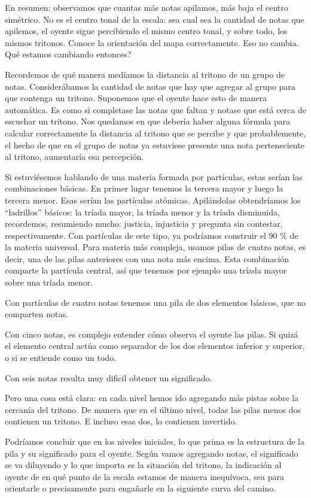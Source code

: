 \documentclass[]{article}
\begin{document}
  En resumen: observamos que cuantas más notas apilamos, más baja el centro simétrico. No es el centro tonal de la escala: sea cual sea la cantidad de notas que apilemos, el oyente sigue percibiendo el mismo centro tonal, y sobre todo, los mismos tritonos. Conoce la orientación del mapa correctamente. Eso no cambia. Qué estamos cambiando entonces?
  
  Recordemos de qué manera medíamos la distancia al tritono de un grupo de notas. Considerábamos la cantidad de notas que hay que agregar al grupo para que contenga un tritono. Suponemos que el oyente hace esto de manera automática. Es como si completase las notas que faltan y notase que está cerca de escuchar un tritono. Nos quedamos en que debería haber alguna fórmula para calcular correctamente la distancia al tritono que se percibe y que probablemente, el hecho de que en el grupo de notas ya estuviese presente una nota perteneciente al tritono, aumentaría esa percepción.
   
  Si estuviésemos hablando de una materia formada por partículas, estas serían las combinaciones básicas. En primer lugar tenemos la tercera mayor y luego la tercera menor. Esas serían las partículas atómicas. Apilándolas obtendríamos los ``ladrillos'' básicos: la tríada mayor, la tríada menor y la tríada disminuida, recordemos, resumiendo mucho: justicia, injusticia y pregunta sin contestar, respectivamente. Con partículas de este tipo, ya podríamos construir el 90 \% de la materia universal. Para materia más compleja, usamos pilas de cuatro notas, es decir, una de las pilas anteriores con una nota más encima. Esta combinación comparte la partícula central, así que tenemos por ejemplo una tríada mayor sobre una tríada menor.
  
  Con partículas de cuatro notas tenemos una pila de dos elementos básicos, que no comparten notas.
  
  Con cinco notas, es complejo entender cómo observa el oyente las pilas. Si quizá el elemento central actúa como separador de los dos elementos inferior y superior, o si se entiende como un todo.
  
  Con seis notas resulta muy dificil obtener un significado.
  
  Pero una cosa está clara: en cada nivel hemos ido agregando más pistas sobre la cercanía del tritono. De manera que en el último nivel, todas las pilas menos dos contienen un tritono. E incluso esas dos, lo contienen invertido.
  
  Podríamos concluir que en los niveles iniciales, lo que prima es la estructura de la pila y su significado para el oyente. Según vamos agregando notas, el significado se va diluyendo y lo que importa es la situación del tritono, la indicación al oyente de en qué punto de la escala estamos de manera inequívoca, sea para orientarle o precisamente para engañarle en la siguiente curva del camino.
  
\end{document}
